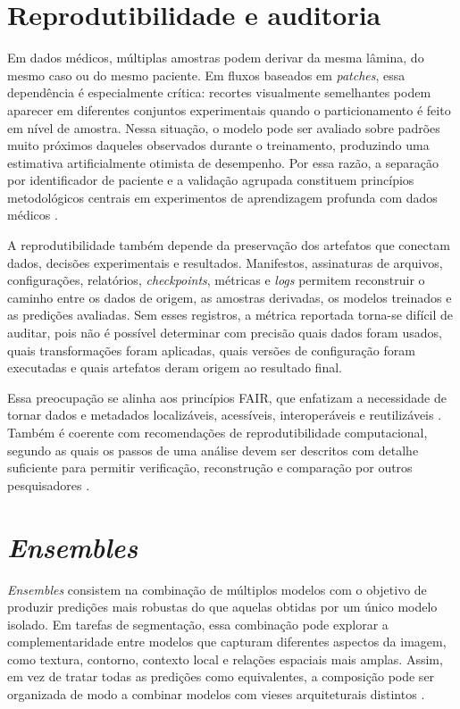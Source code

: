 \section{Reprodutibilidade e auditoria} \label{sec:reprodutibilidade_ferramentas}

Em dados médicos, múltiplas amostras podem derivar da mesma lâmina, do mesmo caso ou do mesmo paciente. Em fluxos baseados em \textit{patches}, essa dependência é especialmente crítica: recortes visualmente semelhantes podem aparecer em diferentes conjuntos experimentais quando o particionamento é feito em nível de amostra. Nessa situação, o modelo pode ser avaliado sobre padrões muito próximos daqueles observados durante o treinamento, produzindo uma estimativa artificialmente otimista de desempenho. Por essa razão, a separação por identificador de paciente e a validação agrupada constituem princípios metodológicos centrais em experimentos de aprendizagem profunda com dados médicos \cite{roberts2017crossvalidation,dawood2026confounding}. 

A reprodutibilidade também depende da preservação dos artefatos que conectam dados, decisões experimentais e resultados. Manifestos, assinaturas de arquivos, configurações, relatórios, \textit{checkpoints}, métricas e \textit{logs} permitem reconstruir o caminho entre os dados de origem, as amostras derivadas, os modelos treinados e as predições avaliadas. Sem esses registros, a métrica reportada torna-se difícil de auditar, pois não é possível determinar com precisão quais dados foram usados, quais transformações foram aplicadas, quais versões de configuração foram executadas e quais artefatos deram origem ao resultado final. 

Essa preocupação se alinha aos princípios FAIR, que enfatizam a necessidade de tornar dados e metadados localizáveis, acessíveis, interoperáveis e reutilizáveis \cite{wilkinson2016fair}. Também é coerente com recomendações de reprodutibilidade computacional, segundo as quais os passos de uma análise devem ser descritos com detalhe suficiente para permitir verificação, reconstrução e comparação por outros pesquisadores \cite{piccolo2016tools}.

\section{\textit{Ensembles}} \label{sec:ensembles_revisao} 

\textit{Ensembles} consistem na combinação de múltiplos modelos com o objetivo de produzir predições mais robustas do que aquelas obtidas por um único modelo isolado. Em tarefas de segmentação, essa combinação pode explorar a complementaridade entre modelos que capturam diferentes aspectos da imagem, como textura, contorno, contexto local e relações espaciais mais amplas. Assim, em vez de tratar todas as predições como equivalentes, a composição pode ser organizada de modo a combinar modelos com vieses arquiteturais distintos \cite{caruana2004ensemble}. 

